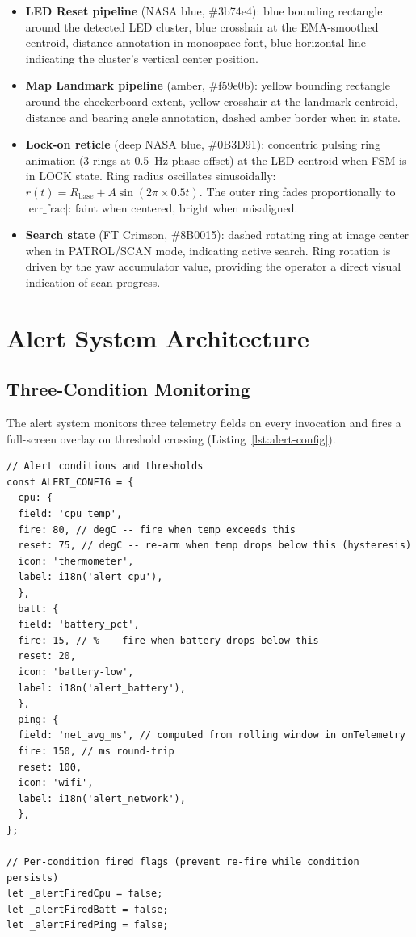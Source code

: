 \begin{itemize}[leftmargin=1.4em]
  \item \textbf{LED Reset pipeline} (NASA blue, \#3b74e4): blue bounding rectangle around the detected LED cluster, blue crosshair at the EMA-smoothed centroid, distance annotation in monospace font, blue horizontal line indicating the cluster's vertical center position.
  \item \textbf{Map Landmark pipeline} (amber, \#f59e0b): yellow bounding rectangle around the checkerboard extent, yellow crosshair at the landmark centroid, distance and bearing angle annotation, dashed amber border when in  state.
  \item \textbf{Lock-on reticle} (deep NASA blue, \#0B3D91): concentric pulsing ring animation (3 rings at 0.5~Hz phase offset) at the LED centroid when FSM is in LOCK state. Ring radius oscillates sinusoidally: $r(t) = R_{\text{base}} + A\sin(2\pi \times 0.5 t)$. The outer ring fades proportionally to $|\text{err\_frac}|$: faint when centered, bright when misaligned.
  \item \textbf{Search state} (FT Crimson, \#8B0015): dashed rotating ring at image center when in PATROL/SCAN mode, indicating active search. Ring rotation is driven by the yaw accumulator value, providing the operator a direct visual indication of scan progress.
\end{itemize}

\section{Alert System Architecture}

\subsection{Three-Condition Monitoring}

The alert system monitors three telemetry fields on every  invocation and fires a full-screen overlay on threshold crossing (Listing~\ref{lst:alert-config}).

\begin{lstlisting}[caption={Alert threshold configuration with hysteresis}, label={lst:alert-config}]
// Alert conditions and thresholds
const ALERT_CONFIG = {
  cpu: {
  field: 'cpu_temp',
  fire: 80, // degC -- fire when temp exceeds this
  reset: 75, // degC -- re-arm when temp drops below this (hysteresis)
  icon: 'thermometer',
  label: i18n('alert_cpu'),
  },
  batt: {
  field: 'battery_pct',
  fire: 15, // % -- fire when battery drops below this
  reset: 20,
  icon: 'battery-low',
  label: i18n('alert_battery'),
  },
  ping: {
  field: 'net_avg_ms', // computed from rolling window in onTelemetry
  fire: 150, // ms round-trip
  reset: 100,
  icon: 'wifi',
  label: i18n('alert_network'),
  },
};

// Per-condition fired flags (prevent re-fire while condition persists)
let _alertFiredCpu = false;
let _alertFiredBatt = false;
let _alertFiredPing = false;
\end{lstlisting}

